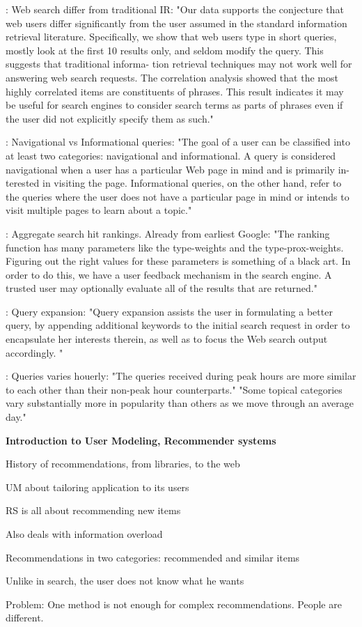 \cite[p1]{Silverstein1999}: Web search differ from traditional IR:
"Our data supports the conjecture that web users differ significantly from the user assumed in the standard information retrieval literature. 
Specifically, we show that web users type in short queries, mostly look at the first 10 results only, and seldom modify the query. 
This suggests that traditional informa- tion retrieval techniques may not work well for answering web search requests. 
The correlation analysis showed that the most highly correlated items are constituents of phrases. 
This result indicates it may be useful for search engines to consider search terms as parts of phrases even if the user did not explicitly specify them as such."

\cite[p1]{Lee2005}: Navigational vs Informational queries: "The goal of a user can be classified into at least two categories: navigational and informational.
A query is considered navigational when a user has a particular Web page in mind and is primarily in- terested in visiting the page. 
Informational queries, on the other hand, refer to the queries where the user does not have a particular page in mind 
or intends to visit multiple pages to learn about a topic."

\cite[p12]{Bender2005}: Aggregate search hit rankings. Already from earliest Google:
"The ranking function has many parameters like the type-weights and the type-prox-weights. Figuring out the right values for these parameters is something of a black art. In order to do this, we have a user feedback mechanism in the search engine. A trusted user may optionally evaluate all of the results that are returned."

\cite[p1]{Chirita2010}: Query expansion:
"Query expansion assists the user in formulating a better query, by appending additional keywords to the initial search request in order to encapsulate her interests therein, as well as to focus the Web search output accordingly. "

\cite[p1]{Beitzel2004}: Queries varies houerly:
"The queries received during peak hours are more similar to each other than their non-peak hour counterparts."
"Some topical categories vary substantially more in popularity than others as we move through an average day."

\textbf{Introduction to User Modeling, Recommender systems}

\begin{itemize*}
  \item History of recommendations, from libraries, to the web
  \item UM about tailoring application to its users
  \item RS is all about recommending new items
  \item Also deals with information overload
  \item Recommendations in two categories: recommended and similar items
  \item Unlike in search, the user does not know what he wants
  \item Problem: One method is not enough for complex recommendations. People are different. 
\end{itemize*}

